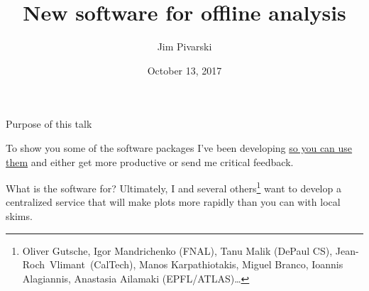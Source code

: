 \documentclass[aspectratio=169]{beamer}
\title[2017-10-13-lpc-testdrive]{New software for offline analysis}
\author{Jim Pivarski}
\institute{Princeton University -- DIANA}
\date{October 13, 2017}
\begin{document}

\begin{frame}
  \titlepage
\end{frame}




\begin{frame}{Purpose of this talk}
\vspace{0.15 cm}
\begin{center}
\large To show you some of the software packages I've been developing \underline{so you can use them} and either get more productive or send me critical feedback.

\vspace{1 cm}
\end{center}
\end{frame}

\begin{frame}{What is the software for?}
\vspace{0.15 cm}
\large Ultimately, I and several others\footnote{Oliver Gutsche, Igor Mandrichenko (FNAL), Tanu Malik (DePaul CS), \mbox{Jean-Roch Vlimant (CalTech),\hspace{-1 cm}} Manos Karpathiotakis, Miguel Branco, Ioannis Alagiannis, Anastasia Ailamaki (EPFL/ATLAS)\ldots} want to develop a centralized service that will make plots more rapidly than you can with local skims.

\vspace{0.5 cm}

\vspace{0.5 cm}

\vspace{0.5 cm}
\end{frame}
\end{document}

